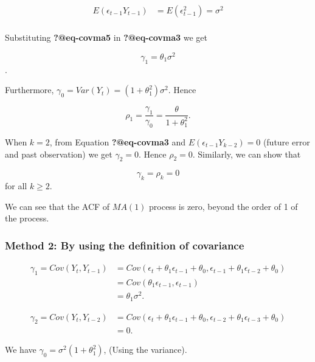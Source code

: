 \documentclass[
  11pt,
  a4paper,
]{report}
\begin{document}
\begin{equation}
\begin{aligned}
E(\epsilon_{t-1}Y_{t-1}) &= E(\epsilon_{t-1}^2)=\sigma^2\\
\end{aligned}
\end{equation}

Substituting \textbf{?@eq-covma5} in \textbf{?@eq-covma3} we get

\[\gamma_1=\theta_1\sigma^2\].

Furthermore, \(\gamma_0 = Var(Y_t)=  (1+\theta_1^2)\sigma^2\). Hence

\[\rho_1=\frac{\gamma_1}{\gamma_0}=\frac{\theta}{1+\theta_1^2}.\]

When \(k=2\), from Equation \textbf{?@eq-covma3} and
\(E(\epsilon_{t-1}Y_{k-2}) = 0\) (future error and past observation) we
get \(\gamma_2=0\). Hence \(\rho_2=0\). Similarly, we can show that

\[\gamma_k = \rho_k=0\] for all \(k \geq 2\).

We can see that the ACF of \(MA(1)\) process is zero, beyond the order
of 1 of the process.

\subsubsection{Method 2: By using the definition of
covariance}\label{method-2-by-using-the-definition-of-covariance}

\begin{equation}
\begin{aligned}
\gamma_1 = Cov(Y_t, Y_{t-1}) &= Cov(\epsilon_t + \theta_1 \epsilon_{t-1}+ \theta_0, \epsilon_{t-1}+\theta_1 \epsilon_{t-2} + \theta_0)\\
&=Cov(\theta_1 \epsilon_{t-1}, \epsilon_{t-1})\\
&=\theta_1 \sigma^2.
\end{aligned}
\end{equation}

\begin{equation}
\begin{aligned}
\gamma_2=Cov(Y_t, Y_{t-2}) &= Cov(\epsilon_t + \theta_1 \epsilon_{t-1}+ \theta_0, \epsilon_{t-2}+\theta_1 \epsilon_{t-3} + \theta_0)\\
&=0.
\end{aligned}
\end{equation}

We have \(\gamma_0=\sigma^2(1+\theta_1^2)\), (Using the variance).
\end{document}
